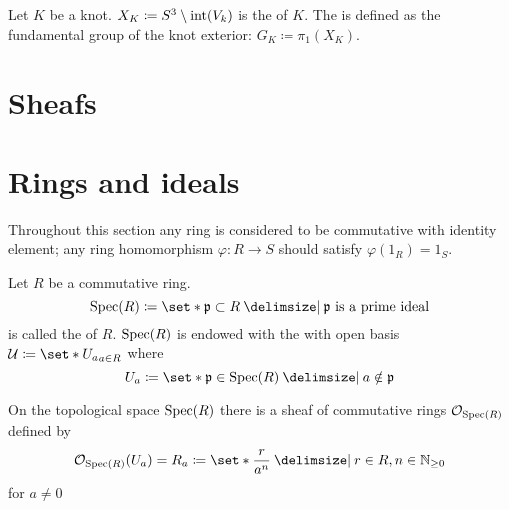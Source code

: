 \begin{definition}
	Let $K$ be a knot. $X_K \coloneqq S^3 \setminus \operatorname{int}(V_k)$ is the  of $K$.
	The  is defined as the fundamental group of the knot exterior: $G_K \coloneqq \pi_1(X_K)$.
\end{definition}

\section{Sheafs} %
\label{sec:sheafs}



\section{Rings and ideals} %
\label{sec:rings_and_ideals}
Throughout this section any ring is considered to be commutative with identity element; any ring homomorphism $\varphi \colon R \to S$ should satisfy $\varphi(1_R) =1_S$.


\begin{definition}
	Let $R$ be a commutative ring. 
	\[
		\Spec(R) \coloneqq \set*{\mathfrak{p} \subset R \given \mathfrak{p} \text{ is a prime ideal} }
	\]
	is called the  of $R$.
	$\operatorname{Spec}(R)$ is endowed with the  with open basis $\mathcal{U} \coloneqq \set*{U_a}_{a \in R}$ where
	\[
		U_a \coloneqq \set*{\mathfrak{p} \in \Spec(R) \given a \notin \mathfrak{p}}
	\] 
\end{definition}

On the topological space $\operatorname{Spec}(R)$ there is a sheaf of commutative rings $\mathcal{O}_{\operatorname{Spec}(R)}$ defined by
\[
	\mathcal{O}_{\Spec(R)}(U_a) = R_a \coloneqq \set*{\frac{r}{a^n} \given r \in R, n \in \mathbb{N}_{\ge 0}}
\]
for $a \neq 0$



\cleardoubleoddemptypage
{}
\setcounter{page}{1}
\appendix
\printbibliography
\printindex
\todototoc
\listoftodos[To-do's]
